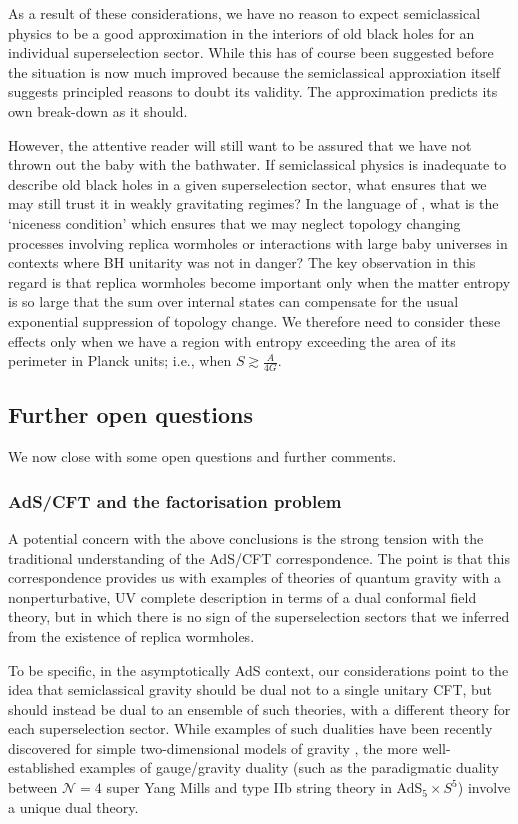 \documentclass[letterpaper,12pt]{article}
\begin{document}
As a result of these considerations, we have no reason to expect semiclassical physics to be a good approximation in the interiors of old black holes for an individual superselection sector. While this has of course been suggested before  the situation is now much improved because the semiclassical approxiation itself suggests principled reasons to doubt its validity.   The approximation predicts its own break-down as it should.

However, the attentive reader will still want to be assured that we have not thrown out the baby with the bathwater. If semiclassical physics is inadequate to describe old black holes in a given superselection sector, what ensures that we may still trust it in weakly gravitating regimes? In the language of \cite{Mathur:2009hf}, what is the `niceness condition' which ensures that we may neglect topology changing processes involving replica wormholes or interactions with large baby universes in contexts where BH unitarity was not in danger? The key observation in this regard is that replica wormholes become important only when the matter entropy is so large that the sum over internal states can compensate for the usual exponential suppression of topology change. We therefore need to consider these effects only when we have a region with entropy exceeding the area of its perimeter in Planck units; i.e., when $S\gtrsim \frac{A}{4G}$.


\subsection{Further open questions}
\label{sec:discussions}

We now close with some open questions and further comments.

\subsubsection{AdS/CFT and the factorisation problem}

A potential concern with the above conclusions is the strong tension with the traditional understanding of the AdS/CFT correspondence. The point is that this correspondence provides us with examples of theories of quantum gravity with a nonperturbative, UV complete description in terms of a dual conformal field theory, but in which there is no sign of the superselection sectors that we inferred from the existence of replica wormholes.

To be specific,
in the asymptotically AdS context, our considerations point to the idea that semiclassical gravity should be dual not to a single unitary CFT, but should instead be dual to an ensemble of such theories, with a different theory for each superselection sector. While examples of such dualities have been recently discovered for simple two-dimensional models of gravity \cite{Saad:2019lba,Stanford:2019vob}, the more well-established examples of gauge/gravity duality (such as the paradigmatic duality between $\mathcal{N}=4$ super Yang Mills and type IIb string theory in AdS$_5\times S^5$) involve a unique dual theory.
\end{document}
